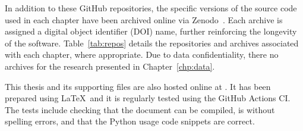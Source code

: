 In addition to these GitHub repositories, the specific versions of the source
code used in each chapter have been archived online via Zenodo~\cite{zenodo}.
Each archive is assigned a digital object identifier (DOI) name, further
reinforcing the longevity of the software. Table~\ref{tab:repos} details the
repositories and archives associated with each chapter, where appropriate. Due
to data confidentiality, there no archives for the research presented in
Chapter~\ref{chp:data}.

\begin{table}[tbhp]
    \centering%
    \resizebox{\textwidth}{!}{%
    }\caption{%
        A summary of the repositories and archives associated with the chapters
        of this thesis%
    }\label{tab:repos}
\end{table}

This thesis and its supporting files are also hosted online at
. It has been prepared using \LaTeX\ and it is
regularly tested using the GitHub Actions CI. The tests include checking that
the document can be compiled, is without spelling errors, and that the Python
usage code snippets are correct.

